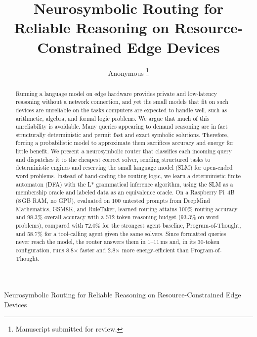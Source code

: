 \documentclass[journal]{IEEEtai}
\begin{document}
\title{Neurosymbolic Routing for Reliable Reasoning on Resource-Constrained Edge Devices}

\author{Anonymous
\thanks{Manuscript submitted for review.}}

{Neurosymbolic Routing for Reliable Reasoning on Resource-Constrained Edge Devices}

\maketitle

\begin{abstract}
Running a language model on edge hardware provides private and low-latency reasoning without a network connection, and yet the small models that fit on such devices are unreliable on the tasks computers are expected to handle well, such as arithmetic, algebra, and formal logic problems. We argue that much of this unreliability is avoidable. Many queries appearing to demand reasoning are in fact structurally deterministic and permit fast and exact symbolic solutions. Therefore, forcing a probabilistic model to approximate them sacrifices accuracy and energy for little benefit. We present a neurosymbolic router that classifies each incoming query and dispatches it to the cheapest correct solver, sending structured tasks to deterministic engines and reserving the small language model (SLM) for open-ended word problems. Instead of hand-coding the routing logic, we learn a deterministic finite automaton (DFA) with the L* grammatical inference algorithm, using the SLM as a membership oracle and labeled data as an equivalence oracle. On a Raspberry Pi~4B (8\,GB RAM, no GPU), evaluated on 100 untested prompts from DeepMind Mathematics, GSM8K, and RuleTaker, learned routing attains 100\% routing accuracy and 98.3\% overall accuracy with a 512-token reasoning budget (93.3\% on word problems), compared with 72.0\% for the strongest agent baseline, Program-of-Thought, and 58.7\% for a tool-calling agent given the same solvers. Since formatted queries never reach the model, the router answers them in 1--11\,ms and, in its 30-token configuration, runs 8.8$\times$ faster and 2.8$\times$ more energy-efficient than Program-of-Thought.
\end{abstract}
\end{document}

